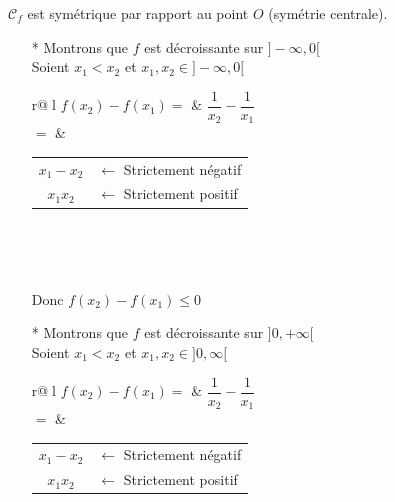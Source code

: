 
\centerline{}

\medskip 

$\mathcal{C}_f$ est symétrique par rapport au point $O$ (symétrie centrale). \\

\newpage 

\begin{itemize}

\item [*] Montrons que $f$ est décroissante sur $]-\infty, 0[$ \\

Soient $x_1 < x_2$   et  $x_1, x_2 \in ] -\infty, 0[$ \\

{\renewcommand{\arraystretch }{1.75}
\begin{tabular}{r@{$\;$}l}
$f(x_2) -f(x_1) =$      &  $ \dfrac{1}{x_2} -\dfrac{1}{x_1} $\\
      $=$ & {\renewcommand{\arraystretch }{1}
            \begin{tabular}{c@{}l}
           $x_1 - x_2$ 
             & $\longleftarrow $ {\footnotesize Strictement négatif}  \\
\cline{1-1}             
           $x_1 x_2$ 
             & $\longleftarrow $ {\footnotesize Strictement positif}  \\  
\end{tabular}}\\   
\end{tabular}}\\

\renewcommand{\arraystretch }{1}

Donc $f(x_2) - f(x_1) \leqslant 0 $ \\


\item [*] Montrons que $f$ est décroissante sur $]0, +\infty[$ \\

Soient $x_1 < x_2$   et  $x_1, x_2 \in ]0, \infty[$ \\

{\renewcommand{\arraystretch }{1.75}
\begin{tabular}{r@{$\;$}l}
$f(x_2) -f(x_1) =$      &  $ \dfrac{1}{x_2} -\dfrac{1}{x_1} $\\
      $=$ & {\renewcommand{\arraystretch }{1}
            \begin{tabular}{c@{}l}
           $x_1 - x_2$ 
             & $\longleftarrow $ {\footnotesize Strictement négatif}  \\
\cline{1-1}             
           $x_1 x_2$ 
             & $\longleftarrow $ {\footnotesize Strictement positif}  \\  
\end{tabular}}\\   
\end{tabular}}\\


\end{itemize}
